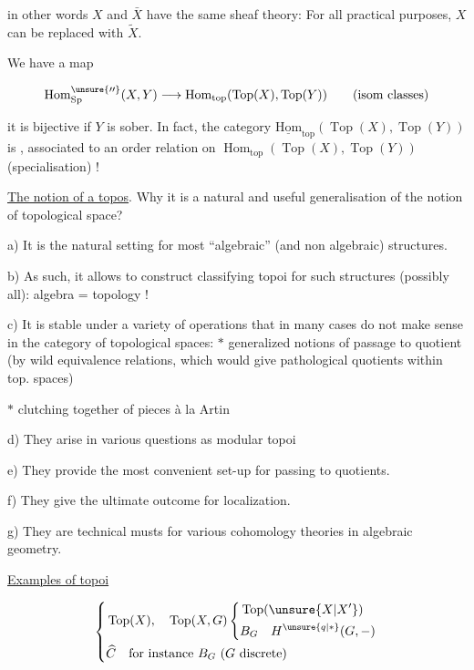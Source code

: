 in other words $X$ and $\bar X$ have the same sheaf theory:
For all  practical purposes, $X$ can be replaced with $\widetilde X$.

 We have a map

\[
\operatorname{Hom}_{\mathrm{Sp}}^{\unsure{\prime\prime}}(X,Y)\longrightarrow
\operatorname{Hom}_{\mathrm{top}}(\operatorname{Top}(X),\operatorname{Top}(Y))
\qquad(\text{isom classes})
\]

it is bijective if $Y$ is sober. In fact, the category $\underline{\mathrm{Hom}}_{\mathrm{top}}(\operatorname{Top}(X),\operatorname{Top}(Y))$
is , associated to an order relation on $\operatorname{Hom}_{\mathrm{top}}(\operatorname{Top}(X),\operatorname{Top}(Y))$
(specialisation) !

\uline{The notion of a topos}. 
Why it is a natural and useful generalisation of the notion of topological space?

a) It is the natural setting for most ``algebraic'' (and non algebraic) structures.

b) As such, it allows to construct classifying topoi for such structures (possibly all): algebra = topology !

c) It is stable under a variety of operations that in many cases do not make sense in the category of topological spaces:
$*$ generalized notions of passage to quotient (by wild equivalence relations, which would give pathological quotients within top. spaces)

$*$ clutching together of pieces à la Artin

d) They arise in various questions  as modular topoi

e) They provide the most convenient set-up for
  passing to quotients.

f) They give the ultimate outcome for  localization.

g) They are technical musts for various cohomology theories
in algebraic geometry.

\uline{Examples of topoi}

\[
\left\{\begin{aligned}
&\operatorname{Top}(X),\quad \operatorname{Top}(X,G)
 \left\{\begin{aligned}&\operatorname{Top}(\unsure{X|X'})\\&B_G\quad H^{\unsure{q|*}}(G,-)\end{aligned}\right.\\
&\widehat C\quad\text{for instance }B_G\ (G\text{ discrete})
\end{aligned}\right.
\]
